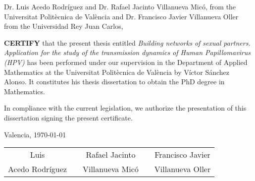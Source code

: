 
\vspace{3cm}
Dr. Luis Acedo Rodr\'{i}guez and Dr. Rafael Jacinto Villanueva Mic\'{o}, from the Universitat Polit\`{e}c\-ni\-ca de Val\`{e}ncia and Dr. Francisco Javier Villanueva Oller from the Universidad Rey Juan Carlos,
\vspace{1.5cm}

\textbf{CERTIFY} that the present thesis entitled \textit{Building networks of sexual partners. Application for the study of the transmission dynamics of Human Papillomavirus (HPV)} has been performed under our supervision in the Department of Applied Mathematics at the Universitat Polit\`{e}cnica de Val\`{e}ncia by V\'{i}ctor S\'{a}nchez Alonso. It constitutes his thesis dissertation to obtain the PhD degree in Mathematics.

In compliance with the current legislation, we authorize the presentation of this dissertation signing the present certificate.

\vspace{1.5cm}

\begin{center}
Valencia, \today
\end{center}

\vspace{5cm}

\begin{center}
\begin{tabular}{ccccc}
Luis & \hspace{1.4cm} & Rafael Jacinto	& \hspace{1.4cm} &  Francisco Javier  \\
Acedo Rodr\'{i}guez & \hspace{1.4cm} & Villanueva Mic\'{o}	& \hspace{1.4cm} &  Villanueva Oller 
\end{tabular} 
\end{center}
